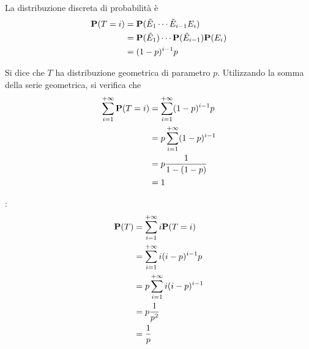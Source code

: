 La distribuzione discreta di probabilità è
\begin{align*}
  \mathbf{P}(T = i) &= \mathbf{P}(\tilde{E}_1 \cdots \tilde{E}_{i-1} E_i) \\
  &= \mathbf{P}(\tilde{E}_1) \cdots \mathbf{P}(\tilde{E}_{i-1}) \mathbf{P}(E_i) \\
  &= (1-p)^{i-1} p  
\end{align*}

Si dice che \( T \) ha distribuzione geometrica di parametro \( p \).
Utilizzando la somma della serie geometrica, si verifica che
\begin{align*}
  \sum_{i=1}^{+ \infty} \mathbf{P}(T = i) &= \sum_{i=1}^{+ \infty} (1-p)^{i-1} p \\
  &= p \sum_{i=1}^{+ \infty} (1-p)^{i-1}  \\
  &= p \frac{1}{1-(1-p)} \\
  &= 1
\end{align*}

:
\begin{align*}
  \mathbf{P}(T) &= \sum_{i=1}^{+ \infty} i \mathbf{P}(T = i) \\
  &= \sum_{i=1}^{+ \infty} i (i - p)^{i-1} p \\
  &= p \sum_{i=1}^{+ \infty} i (i - p)^{i-1} \\
  &= p \frac{1}{p^2} \\
  &= \frac{1}{p}
\end{align*}

